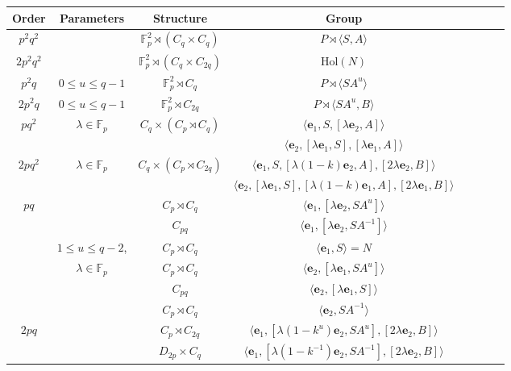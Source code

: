 \documentclass[a4paper,reqno]{amsart}
\theoremstyle{definition}
\newcommand{\e}{\textbf{e}}
\newcommand{\Hol}{\mathrm{Hol}}
\begin{document}
\begin{table}
\centering
    \begin{tabular}{|c|c|c|c|c|c|c|c|} \hline
        Order & Parameters  & Structure & Group\\
        \hline 
        $p^2 q^2$ & & $\mathbb{F}_p^2 \rtimes (C_q \times C_q)$ &  $P \rtimes \langle S, A\rangle$\\
        \hline
        $2 p^2 q^2 $ & & $\mathbb{F}_p^2 \rtimes(C_q \times C_{2q})$   & $\Hol(N)$\\
        \hline
        $p^2 q$ & $0 \leq u \leq q-1$ & $\mathbb{F}_p^2 \rtimes C_q$ & $P \rtimes\langle S A^u \rangle$\\
        \hline
        $2p^2 q$ & $0 \leq u \leq q-1$ & $\mathbb{F}_p^2 \rtimes C_{2q}$  & $P \rtimes \langle SA^u, B \rangle$\\
        \hline
        $pq^2$ & \multirow{2}{3em}{$\lambda \in \mathbb{F}_p$} & \multirow{2}{7em}{$C_q\times(C_p \rtimes C_q)$} & $\langle \e_1,S, [\lambda \e_2, A] \rangle$\\ 
        &  & &
       $\langle \e_2,  [\lambda \e_1,S], [\lambda \e_1, A] \rangle$\\
       \hline
        $2pq^2$ & \multirow{2}{3em}{$\lambda \in \mathbb{F}_p$} & \multirow{2}{7em}{$C_q \times (C_p \rtimes C_{2q})$ }& $\langle \e_1,S, [\lambda (1-k)\e_2, A], [2 \lambda \e_2, B] \rangle$\\   
        &  & & $\langle \e_2, [\lambda\e_1,S], [\lambda (1-k)\e_1, A], [2\lambda \e_1, B] \rangle$\\
        \hline
        $pq$ &  & $C_p\rtimes C_q$ & $\langle \e_1, [\lambda \e_2, SA^u] \rangle$\\
        &  & $C_{pq}$ & $\langle \e_1,
        [\lambda \e_2, SA^{-1}] \rangle$\\ 
        & $1 \leq u \leq q-2$, & $C_p \rtimes C_q$ & $\langle \e_1, S \rangle = N$\\ 
        & $\lambda \in \mathbb{F}_p$ & $C_p
        \rtimes C_q$ &  $\langle \e_2, [\lambda \e_1, SA^u]\rangle$\\ 
        & & $C_{pq}$ & $\langle \e_2,[\lambda \e_1, S] \rangle$\\ 
        & & $C_p \rtimes C_q$ &  $\langle \e_2, SA^{-1} \rangle$ \\ \hline
        $2pq$ &  &  $C_p\rtimes C_{2q}$ & $\langle \e_1, [\lambda (1-k^u)\e_2, SA^u],[2 \lambda\e_2, B] \rangle$ \\ 
        &  & $D_{2p} \times C_q$ & $\langle \e_1, [\lambda(1-k^{-1})\e_2, SA^{-1}], [2\lambda \e_2, B]\rangle$\\ 

\end{tabular}
\end{table}
\end{document}
